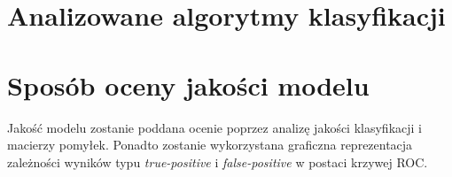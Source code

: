 \documentclass[a4paper, 12pt]{article}
\begin{document}

\section{Analizowane algorytmy klasyfikacji}\label{algorithms}

\section{Sposób oceny jakości modelu}
Jakość modelu zostanie poddana ocenie poprzez analizę jakości klasyfikacji i macierzy pomyłek. Ponadto zostanie wykorzystana graficzna reprezentacja zależności wyników typu \textit{true-positive} i \textit{false-positive} w postaci krzywej ROC.
\end{document}
